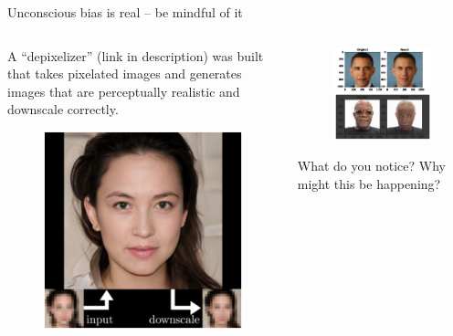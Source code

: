 \documentclass[aspectratio=169]{../latex_main/tntbeamer}  %
\begin{document}
    \begin{frame}{Unconscious bias is real – be mindful of it}
    \begin{columns}
        \begin{column}{.4\textwidth}
            A “depixelizer” (link in description) was built that takes pixelated images and generates images that are perceptually realistic and downscale correctly.
            \begin{figure}
                \centering
                \includegraphics[scale=.5]{bild11}
            \end{figure}
        \end{column}
        \begin{column}{.4\textwidth}
            \begin{figure}
                \centering
                \includegraphics[scale=.37]{bild12}
            \end{figure}
            What do you notice? Why might this be happening?
        \end{column}
    \end{columns}
    
    \end{frame}
    
\end{document}
